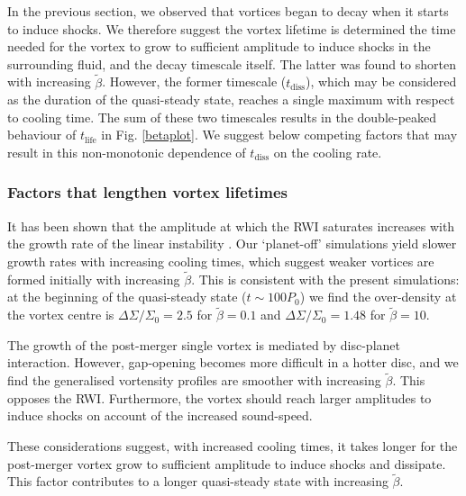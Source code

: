 In the previous section, we observed that vortices began to decay when
it starts to induce shocks. We therefore suggest the vortex lifetime
is determined the time needed for the vortex to grow to 
sufficient amplitude to induce shocks in the surrounding fluid, and 
the decay timescale itself. The latter was found to shorten 
with increasing $\tilde{\beta}$. However, the former timescale
($t_\mathrm{diss}$), which may be considered as the 
duration of the quasi-steady state, reaches a single maximum with
respect to cooling time. The sum of these two timescales results in the
double-peaked behaviour of $t_\mathrm{life}$ in Fig. \ref{betaplot}. 
We suggest below competing factors that may result in this
non-monotonic dependence of $t_\mathrm{diss}$ on the cooling rate.  

\subsubsection{Factors that lengthen vortex lifetimes}
It has been shown that the amplitude at which the RWI saturates 
increases with the growth rate of the linear instability  
\citep{meheut2013}. Our `planet-off' simulations yield slower growth
rates with increasing cooling times, which suggest weaker vortices are
formed initially with increasing $\tilde{\beta}$. This is consistent
with the present simulations: at the beginning of the 
quasi-steady  state ($t\sim100P_0$) we find the over-density at the
vortex centre is $\Delta\Sigma/\Sigma_0=2.5$ for $\tilde\beta=0.1$ and
$\Delta\Sigma/\Sigma_0=1.48$ for $\tilde\beta=10$.%


The growth of the post-merger single vortex is mediated by disc-planet
interaction. However, gap-opening becomes more difficult in a hotter 
disc, and we find the generalised vortensity 
profiles are smoother with increasing $\tilde{\beta}$. This opposes
the RWI. 
Furthermore, the vortex should reach larger amplitudes to induce
shocks on account of the increased sound-speed.  

These considerations suggest, with increased cooling times, 
it takes longer for the post-merger vortex grow to sufficient
amplitude to induce shocks and dissipate. This factor contributes to a
longer quasi-steady state with increasing $\tilde{\beta}$.       


